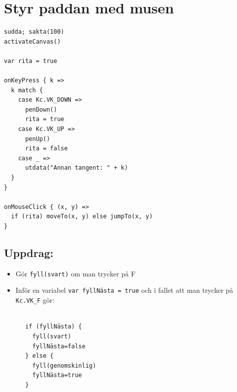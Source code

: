 \chapter{Styr paddan med musen}
\begin{multicols}{2}

\begin{lstlisting}[basicstyle={\ttfamily\fontsize{16}{19}\selectfont},numbers=none]
sudda; sakta(100)
activateCanvas()

var rita = true

onKeyPress { k =>
  k match {
    case Kc.VK_DOWN => 
      penDown()
      rita = true
    case Kc.VK_UP => 
      penUp()
      rita = false
    case _ => 
      utdata("Annan tangent: " + k)
  }
}

onMouseClick { (x, y) =>
  if (rita) moveTo(x, y) else jumpTo(x, y)
}
\end{lstlisting}
        


\columnbreak


\section*{\color{BrickRed}Uppdrag:}


\begin{itemize}

\item {Gör \lstinline{fyll(svart)} om man trycker på F}
\item {Inför en variabel \lstinline{var fyllNästa = true} och i fallet att man trycker på \lstinline{Kc.VK_F} gör:}

\end{itemize}



\begin{lstlisting}[numbers=none]

      if (fyllNästa) {
        fyll(svart)
        fyllNästa=false
      } else {
        fyll(genomskinlig)
        fyllNästa=true
      }
      
\end{lstlisting}
        
\end{multicols}

